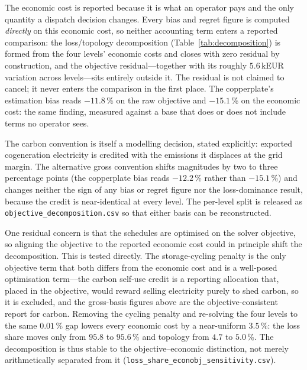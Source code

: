 The economic cost is reported because it is what an operator pays and the only quantity a
dispatch decision changes. Every bias and regret figure is computed \emph{directly} on this
economic cost, so neither accounting term enters a reported comparison: the loss/topology
decomposition (Table~\ref{tab:decomposition}) is formed from the four levels' economic costs and
closes with zero residual by construction, and the objective residual---together with its
roughly $5.6$\,kEUR variation across levels---sits entirely outside it. The residual is not
claimed to cancel; it never enters the comparison in the first place. The copperplate's
estimation bias reads $-11.8$\,\% on the raw objective and $\mathbf{-15.1}$\,\% on the
economic cost: the same finding, measured against a base that does or does not include
terms no operator sees.

The carbon convention is itself a modelling decision, stated explicitly: exported
cogeneration electricity is credited with the emissions it displaces at the grid margin.
The alternative gross convention shifts magnitudes by two to three percentage points
(the copperplate bias reads $-12.2$\,\% rather than $-15.1$\,\%) and changes neither the
sign of any bias or regret figure nor the loss-dominance result, because the credit is
near-identical at every level. The per-level split is released as
\texttt{objective\_decomposition.csv} so that either basis can be reconstructed.

One residual concern is that the schedules are optimised on the solver objective, so
aligning the objective to the reported economic cost could in principle shift the
decomposition. This is tested directly. The storage-cycling penalty is the only objective
term that both differs from the economic cost and is a well-posed optimisation term---the
carbon self-use credit is a reporting allocation that, placed in the objective, would reward
selling electricity purely to shed carbon, so it is excluded, and the gross-basis figures
above are the objective-consistent report for carbon. Removing the cycling penalty and
re-solving the four levels to the same $0.01$\,\% gap lowers every economic cost by a
near-uniform $3.5$\,\%: the loss share moves only from $95.8$ to $95.6$\,\% and topology
from $4.7$ to $5.0$\,\%. The decomposition is thus stable to the objective--economic
distinction, not merely arithmetically separated from it
(\texttt{loss\_share\_econobj\_sensitivity.csv}).
